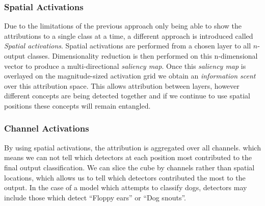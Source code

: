 \subsubsection{Spatial Activations}
Due to the limitations of the previous approach only being able to show the attributions to a single class at a time, a different approach is introduced called \emph{Spatial activations}. Spatial activations are performed from a chosen layer to all $n$-output classes. Dimensionality reduction is then performed on this n-dimensional vector to produce a multi-directional \emph{saliency map}. Once this \emph{saliency map} is overlayed on the magnitude-sized activation grid we obtain an \emph{information scent} over this attribution space. This allows attribution between layers, however different concepts are being detected together and if we continue to use spatial positions these concepts will remain entangled.

\subsubsection{Channel Activations}
By using spatial activations, the attribution is aggregated over all channels. which means we can not tell which detectors at each position most contributed to the final output classification. We can slice the cube by channels rather than spatial locations, which allows us to tell which detectors contributed the most to the output. In the case of a model which attempts to classify dogs, detectors may include those which detect ``Floppy ears'' or ``Dog snouts''.
